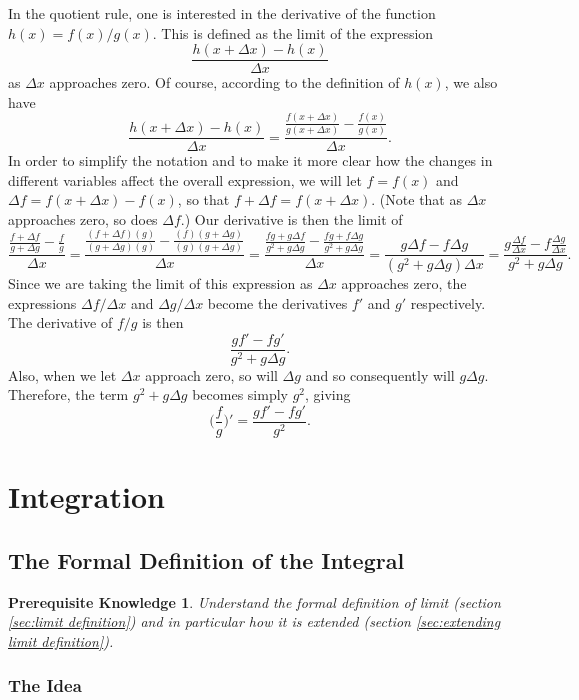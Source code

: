 \documentclass{myarticle}
\theoremstyle{nospace}
\newtheorem*{oldprereq}{Prerequisite Knowledge}
\newenvironment{prereq}
{\begin{mdframed}\begin{oldprereq}}
    {\end{oldprereq}\end{mdframed}}
\newtheorem{old series theorem}{Theorem}
\newenvironment{series theorem}
{\begin{mdframed}\begin{old series theorem}}
    {\end{old series theorem}\end{mdframed}}
\begin{document}
In the quotient rule, one is interested in the derivative of the
function $h(x) = f(x)/g(x)$. This is defined as the limit of the
expression
\[
  \frac{h(x + \Delta x) - h(x)}{\Delta x}
\]
as $\Delta x$ approaches zero. Of course, according to the definition
of $h(x)$, we also have
\[
  \frac{h(x + \Delta x) - h(x)}{\Delta x}
  = \frac{\frac{f(x + \Delta x)}{g(x + \Delta x)}
    - \frac{f(x)}{g(x)}}{\Delta x}.
\]
In order to simplify the notation and to make it more clear how the
changes in different variables affect the overall expression, we will
let $f = f(x)$ and $\Delta f = f(x + \Delta x) - f(x)$, so that
$f + \Delta f = f(x + \Delta x)$. (Note that as $\Delta x$ approaches
zero, so does $\Delta f$.) Our derivative is then the limit of
\[
  \frac{\frac{f + \Delta f}{g + \Delta g} - \frac{f}{g}}{\Delta x}
  = \frac{\frac{(f + \Delta f)(g)} {(g + \Delta g)(g)} - \frac{(f)(g +
      \Delta g)}{(g)(g + \Delta g)}}{\Delta x}
  = \frac{\frac{fg + g\Delta f}{g^2 + g\Delta g} - \frac{fg + f\Delta
      g}{g^2 + g\Delta g}}{\Delta x}
  = \frac{g\Delta f - f\Delta g}{(g^2 + g\Delta g)\Delta x}
  = \frac{g\frac{\Delta f}{\Delta x} - f\frac{\Delta g}{\Delta x}}{g^2
    + g\Delta g}.
\]
Since we are taking the limit of this expression as $\Delta x$
approaches zero, the expressions $\Delta f/\Delta x$ and
$\Delta g/\Delta x$ become the derivatives $f'$ and $g'$ respectively.
The derivative of $f/g$ is then
\[
  \frac{gf' - fg'}{g^2 + g\Delta g}.
\]
Also, when we let $\Delta x$ approach zero, so will $\Delta g$ and so
consequently will $g\Delta g$. Therefore, the term $g^2 + g\Delta g$
becomes simply $g^2$, giving
\[
  \bigg(\frac{f}{g}\bigg)' = \frac{gf' - fg'}{g^2}.
\]

\section{Integration}
\label{sec:integration}

\subsection{The Formal Definition of the Integral}
\label{sec:integral definition}

\begin{prereq}
  Understand the formal definition of limit (section \ref{sec:limit
    definition}) and in particular how it is extended (section
  \ref{sec:extending limit definition}).
\end{prereq}

\subsubsection{The Idea}
\label{sec:integral definition idea}
\end{document}
